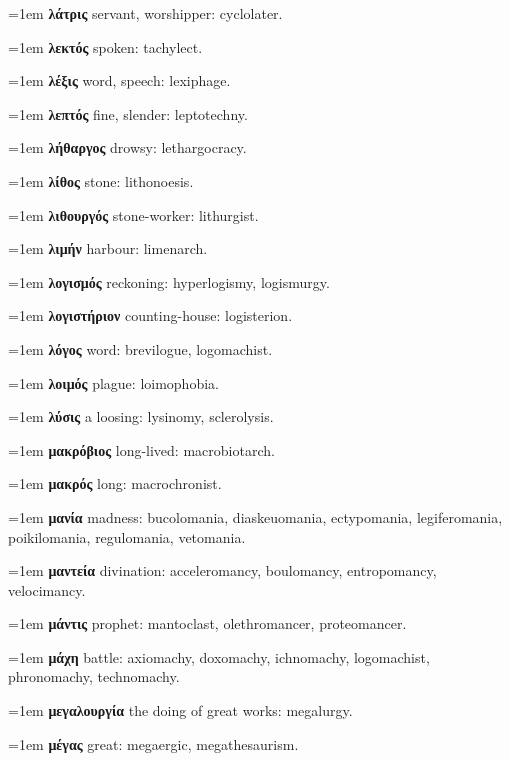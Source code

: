 \hangindent=1em \textbf{λάτρις} servant, worshipper: cyclolater.\par
\hangindent=1em \textbf{λεκτός} spoken: tachylect.\par
\hangindent=1em \textbf{λέξις} word, speech: lexiphage.\par
\hangindent=1em \textbf{λεπτός} fine, slender: leptotechny.\par
\hangindent=1em \textbf{λήθαργος} drowsy: lethargocracy.\par
\hangindent=1em \textbf{λίθος} stone: lithonoesis.\par
\hangindent=1em \textbf{λιθουργός} stone-worker: lithurgist.\par
\hangindent=1em \textbf{λιμήν} harbour: limenarch.\par
\hangindent=1em \textbf{λογισμός} reckoning: hyperlogismy, logismurgy.\par
\hangindent=1em \textbf{λογιστήριον} counting-house: logisterion.\par
\hangindent=1em \textbf{λόγος} word: brevilogue, logomachist.\par
\hangindent=1em \textbf{λοιμός} plague: loimophobia.\par
\hangindent=1em \textbf{λύσις} a loosing: lysinomy, sclerolysis.\par
\hangindent=1em \textbf{μακρόβιος} long-lived: macrobiotarch.\par
\hangindent=1em \textbf{μακρός} long: macrochronist.\par
\hangindent=1em \textbf{μανία} madness: bucolomania, diaskeuomania, ectypomania, legiferomania, poikilomania, regulomania, vetomania.\par
\hangindent=1em \textbf{μαντεία} divination: acceleromancy, boulomancy, entropomancy, velocimancy.\par
\hangindent=1em \textbf{μάντις} prophet: mantoclast, olethromancer, proteomancer.\par
\hangindent=1em \textbf{μάχη} battle: axiomachy, doxomachy, ichnomachy, logomachist, phronomachy, technomachy.\par
\hangindent=1em \textbf{μεγαλουργία} the doing of great works: megalurgy.\par
\hangindent=1em \textbf{μέγας} great: megaergic, megathesaurism.\par
